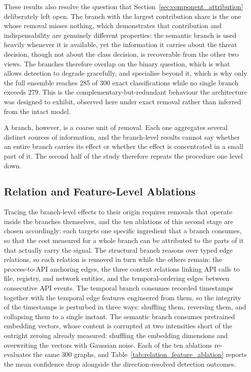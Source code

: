 \documentclass[%
    BCOR=10mm,
    DIV=13,
    toc=bibliography,
    toc=listof,
    oneside,
    12pt,
]{scrbook}
\begin{document}
These results also resolve the question that
Section~\ref{sec:component_attribution} deliberately left open. The branch
with the largest contribution share is the one whose removal misses nothing,
which demonstrates that contribution and indispensability are genuinely
different properties: the semantic branch is used heavily whenever it is
available, yet the information it carries about the threat decision, though
not about the class decision, is recoverable from the other two views. The
branches therefore overlap on the binary question, which is what allows
detection to degrade gracefully, and specialise beyond it, which is why only
the full ensemble reaches 285 of 300 exact classifications while no single
branch exceeds 279. This is the complementary-but-redundant behaviour the
architecture was designed to exhibit, observed here under exact removal
rather than inferred from the intact model.

A branch, however, is a coarse unit of removal. Each one aggregates several
distinct sources of information, and the branch-level results cannot say
whether an entire branch carries its effect or whether the effect is
concentrated in a small part of it. The second half of the study therefore
repeats the procedure one level down.

\subsection{Relation and Feature-Level Ablations}
\label{subsec:relation_feature_ablation}

Tracing the branch-level effects to their origin requires removals that
operate inside the branches themselves, and the ten ablations of this second
stage are chosen accordingly: each targets one specific ingredient that a
branch consumes, so that the cost measured for a whole branch can be
attributed to the parts of it that actually carry the signal. The structural
branch reasons over typed edge relations, so each relation is removed in turn
while the others remain: the process-to-API
anchoring edges, the three context relations linking API calls to file,
registry, and network entities, and the temporal-ordering edges between
consecutive API events. The temporal branch consumes recorded timestamps
together with the temporal edge features engineered from them, so the
integrity of the timestamps is perturbed in three ways: shuffling
them, reversing them, and collapsing them to a single instant. The semantic branch
consumes pretrained embedding vectors, whose content is corrupted at two
intensities short of the outright zeroing already measured: shuffling the
embedding dimensions and overwriting the vectors with Gaussian noise. Each of
the ten ablations re-evaluates the same 300 graphs, and
Table~\ref{tab:relation_feature_ablation} reports the mean confidence drop
alongside the direction-resolved detection outcomes.
\end{document}
